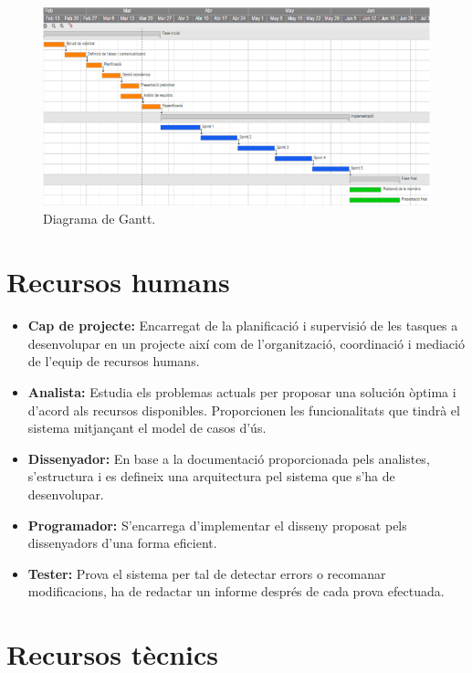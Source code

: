 \begin{figure}[!h]
\centering
\includegraphics[scale=0.65]{Figures/Gantt.jpg}
\caption{Diagrama de Gantt.}
\end{figure}

\section{Recursos humans}

\begin{itemize}

\item{}\textbf{Cap de projecte:} Encarregat de la planificació i supervisió de les tasques a desenvolupar en un projecte així com de l’organització, coordinació i mediació de l’equip de recursos humans.
\item{}\textbf{Analista:} Estudia els problemas actuals per proposar una solución òptima i d’acord als recursos disponibles. Proporcionen les funcionalitats que tindrà el sistema mitjançant el model de casos d’ús.
\item{}\textbf{Dissenyador:} En base a la documentació proporcionada pels analistes, s’estructura i es defineix una arquitectura pel sistema que s’ha de desenvolupar. 
\item{}\textbf{Programador:} S’encarrega d’implementar el disseny proposat pels dissenyadors d’una forma eficient.
\item{}\textbf{Tester:} Prova el sistema per tal de detectar errors o recomanar modificacions, ha de redactar un informe després de cada prova efectuada.
\end{itemize}

\section{Recursos tècnics}


